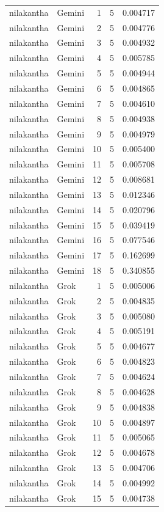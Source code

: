 \begin{longtable}{llrrr}
nilakantha & Gemini & 1 & 5 & 0.004717\\
nilakantha & Gemini & 2 & 5 & 0.004776\\
nilakantha & Gemini & 3 & 5 & 0.004932\\
nilakantha & Gemini & 4 & 5 & 0.005785\\
nilakantha & Gemini & 5 & 5 & 0.004944\\
nilakantha & Gemini & 6 & 5 & 0.004865\\
nilakantha & Gemini & 7 & 5 & 0.004610\\
nilakantha & Gemini & 8 & 5 & 0.004938\\
nilakantha & Gemini & 9 & 5 & 0.004979\\
nilakantha & Gemini & 10 & 5 & 0.005400\\
nilakantha & Gemini & 11 & 5 & 0.005708\\
nilakantha & Gemini & 12 & 5 & 0.008681\\
nilakantha & Gemini & 13 & 5 & 0.012346\\
nilakantha & Gemini & 14 & 5 & 0.020796\\
nilakantha & Gemini & 15 & 5 & 0.039419\\
nilakantha & Gemini & 16 & 5 & 0.077546\\
nilakantha & Gemini & 17 & 5 & 0.162699\\
nilakantha & Gemini & 18 & 5 & 0.340855\\
nilakantha & Grok & 1 & 5 & 0.005006\\
nilakantha & Grok & 2 & 5 & 0.004835\\
nilakantha & Grok & 3 & 5 & 0.005080\\
nilakantha & Grok & 4 & 5 & 0.005191\\
nilakantha & Grok & 5 & 5 & 0.004677\\
nilakantha & Grok & 6 & 5 & 0.004823\\
nilakantha & Grok & 7 & 5 & 0.004624\\
nilakantha & Grok & 8 & 5 & 0.004628\\
nilakantha & Grok & 9 & 5 & 0.004838\\
nilakantha & Grok & 10 & 5 & 0.004897\\
nilakantha & Grok & 11 & 5 & 0.005065\\
nilakantha & Grok & 12 & 5 & 0.004678\\
nilakantha & Grok & 13 & 5 & 0.004706\\
nilakantha & Grok & 14 & 5 & 0.004992\\
nilakantha & Grok & 15 & 5 & 0.004738\\

\end{longtable}
